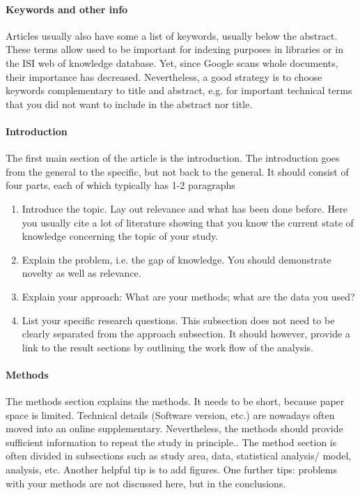 \documentclass{tufte-book}
\begin{document}
\paragraph{Keywords and other info}Articles usually also have some a list of keywords, usually below the abstract. These terms allow used to be important for indexing purposes in libraries or in the ISI web of knowledge database. Yet, since Google scans whole documents, their importance has decreased. Nevertheless, a good strategy is to choose keywords complementary to title and abstract, e.g. for important technical terms that you did not want to include in the abstract nor title.


\paragraph{Introduction} The first main section of the article is the introduction. The introduction goes from the general to the specific, but not back to the general. It should consist of four parts, each of which typically has 1-2 paragraphs

\begin{enumerate}
\item Introduce the topic. Lay out relevance and what has been done before. Here you usually cite a lot of literature showing that you know the current state of knowledge concerning the topic of your study.
\item Explain the problem, i.e. the gap of knowledge. You should demonstrate novelty as well as relevance.
\item Explain your approach: What are your methods; what are the data you used?
\item List your specific research questions. This subsection does not need to be clearly separated from the approach subsection. It should however, provide a link to the result sections by outlining the work flow of the analysis.
\end{enumerate}

\paragraph{Methods} The methods section explains the methods. It needs to be short, because paper space is limited. Technical details (Software version, etc.) are nowadays often moved into an online supplementary. Nevertheless, the methods should provide sufficient information to repeat the study in principle.. The method section is often divided in subsections such as study area, data, statistical analysis/ model, analysis, etc. Another helpful tip is to add figures. One further tips: problems with your methods are not discussed here, but in the conclusions.
\end{document}
